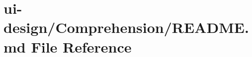 \hypertarget{Comprehension_2README_8md}{}\section{ui-\/design/\+Comprehension/\+R\+E\+A\+D\+ME.md File Reference}
\label{Comprehension_2README_8md}
